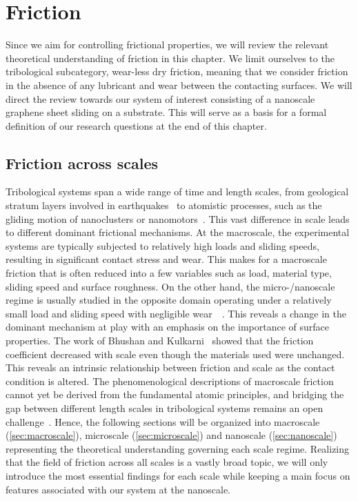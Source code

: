 
\chapter{Friction}\label{chap:friction} 
Since we aim for controlling frictional properties, we will review the relevant theoretical understanding of friction in this chapter. We limit ourselves to the tribological subcategory, wear-less dry friction, meaning that we consider friction in the absence of any lubricant and wear between the contacting surfaces. We will direct the review towards our system of interest consisting of a nanoscale graphene sheet sliding on a substrate. This will serve as a basis for a formal definition of our research questions at the end of this chapter.



\section{Friction across scales}
Tribological systems span a wide range of time and length scales, from
geological stratum layers involved in earthquakes~\cite{kim_nano-scale_2009} to
atomistic processes, such as the gliding motion of nanoclusters or nanomotors~\cite{Manini_2016}. This vast difference in scale leads to different dominant
frictional mechanisms. At the macroscale, the experimental systems are typically subjected to relatively high loads and sliding speeds, resulting in significant contact stress and wear. This makes for a macroscale friction that is often reduced into a few variables such as load, material type, sliding speed and surface roughness. On the other hand, the micro-/nanoscale regime is usually studied in the opposite domain operating under a relatively small load and sliding speed with negligible wear~\cite{kim_nano-scale_2009}~\cite[p. 5]{bhushan_2013}. This reveals a change in the dominant mechanism at play with an emphasis on the importance of surface properties. The work of Bhushan and Kulkarni~\cite{BHUSHAN199649} showed that the friction coefficient decreased with scale even though the materials used were unchanged. This reveals an intrinsic relationship between friction and scale as the contact condition is altered. The phenomenological descriptions of macroscale friction cannot yet be derived
from the fundamental atomic principles, and bridging the gap between different
length scales in tribological systems remains an open challenge~\cite{Manini_2016}. Hence, the following sections will be organized into
macroscale (\cref{sec:macroscale}), microscale (\cref{sec:microscale}) and
nanoscale (\cref{sec:nanoscale}) representing the theoretical understanding
governing each scale regime. Realizing that the field of friction across all
scales is a vastly broad topic, we will only introduce the most essential findings for each scale while keeping a main focus on features associated with our system at the nanoscale.



